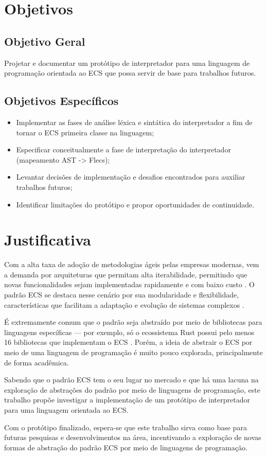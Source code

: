 \section{Objetivos} \label{sec:objetivos}

\subsection{Objetivo Geral} \label{sec:obj_geral}

Projetar e documentar um protótipo de interpretador para uma linguagem de programação orientada ao ECS que possa servir de base para trabalhos futuros.

\subsection{Objetivos Específicos}

\begin{itemize}
    \item Implementar as fases de análise léxica e sintática do interpretador a fim de tornar o ECS primeira classe na linguagem;
    \item Especificar conceitualmente a fase de interpretação do interpretador (mapeamento AST -> Flecs);
    \item Levantar decisões de implementação e desafios encontrados para auxiliar trabalhos futuros;
    \item Identificar limitações do protótipo e propor oportunidades de continuidade.
\end{itemize}

\section{Justificativa} \label{sec:justificativa}

Com a alta taxa de adoção de metodologias ágeis pelas empresas modernas, vem a demanda por arquiteturas que permitam alta iterabilidade, permitindo que novas funcionalidades sejam implementadas rapidamente e com baixo custo \cite{17thstateofagile, agile}. O padrão ECS se destaca nesse cenário por sua modularidade e flexibilidade, características que facilitam a adaptação e evolução de sistemas complexos \cite{ecsfaq}.

É extremamente comum que o padrão seja abstraído por meio de bibliotecas para linguagens específicas — por exemplo, só o ecossistema Rust possui pelo menos 16 bibliotecas que implementam o ECS \cite{arewegameyet}. Porém, a ideia de abstrair o ECS por meio de uma linguagem de programação é muito pouco explorada, principalmente de forma acadêmica.

Sabendo que o padrão ECS tem o seu lugar no mercado e que há uma lacuna na exploração de abstrações do padrão por meio de linguagens de programação, este trabalho propõe investigar a implementação de um protótipo de interpretador para uma linguagem orientada ao ECS.

Com o protótipo finalizado, espera-se que este trabalho sirva como base para futuras pesquisas e desenvolvimentos na área, incentivando a exploração de novas formas de abstração do padrão ECS por meio de linguagens de programação.
